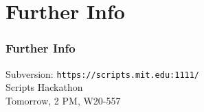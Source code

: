 \section{Further Info}
\begin{frame}
  \frametitle{Further Info}
  Subversion: {\tt https://scripts.mit.edu:1111/}
  \\
  Scripts Hackathon \\ Tomorrow, 2 PM, W20-557
\end{frame}
